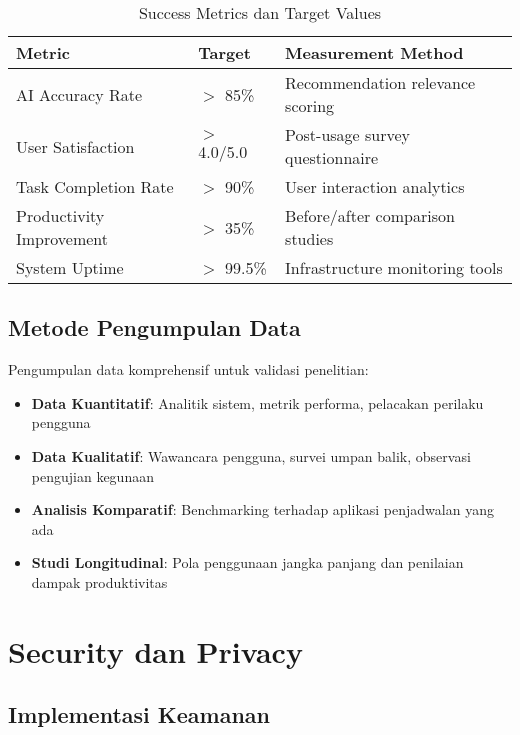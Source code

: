 \begin{table}[ht]
\centering
\caption{Success Metrics dan Target Values}
\label{tab:success-metrics}
\footnotesize
\begin{adjustbox}{width=\textwidth,center}
\begin{tabular}{@{}p{4cm}p{3cm}p{6cm}@{}}
\toprule
\textbf{Metric} & \textbf{Target} & \textbf{Measurement Method} \\
\midrule
AI Accuracy Rate & $>$ 85\% & Recommendation relevance scoring \\
\hline
User Satisfaction & $>$ 4.0/5.0 & Post-usage survey questionnaire \\
\hline
Task Completion Rate & $>$ 90\% & User interaction analytics \\
\hline
Productivity Improvement & $>$ 35\% & Before/after comparison studies \\
\hline
System Uptime & $>$ 99.5\% & Infrastructure monitoring tools \\
\bottomrule
\end{tabular}
\end{adjustbox}
\end{table}

\subsection{Metode Pengumpulan Data}

Pengumpulan data komprehensif untuk validasi penelitian:

\begin{itemize}
\item \textbf{Data Kuantitatif}: Analitik sistem, metrik performa, pelacakan perilaku pengguna
\item \textbf{Data Kualitatif}: Wawancara pengguna, survei umpan balik, observasi pengujian kegunaan
\item \textbf{Analisis Komparatif}: Benchmarking terhadap aplikasi penjadwalan yang ada
\item \textbf{Studi Longitudinal}: Pola penggunaan jangka panjang dan penilaian dampak produktivitas
\end{itemize}

\section{Security dan Privacy}

\subsection{Implementasi Keamanan}

